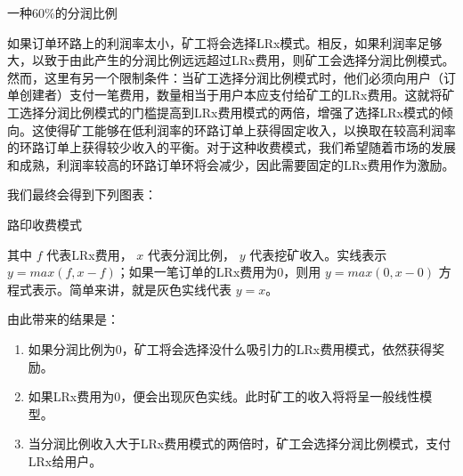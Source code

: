 \documentclass[UTF8]{ctexart}
\makeatletter
\newenvironment{figurehere}
 {\def\@captype{figure}}
 {}
\makeatother
\begin{document}
\begin{multicols}{2}
\begin{center}
\begin{figurehere}
\begin{tikzpicture}[
scale=1,
font=\normalfont,
classical/.style={thick,<->,shorten >=2pt,shorten <=2pt,>=stealth},
oneway/.style={->,dashed,shorten >=2pt,shorten <=2pt,>=stealth}
]
\end{tikzpicture}
\caption{一种60\%的分润比例}
\label{fig:marginsplit}
\end{figurehere}
\end{center}

如果订单环路上的利润率太小，矿工将会选择LRx模式。相反，如果利润率足够大，以致于由此产生的分润比例远远超过LRx费用，则矿工会选择分润比例模式。然而，这里有另一个限制条件：当矿工选择分润比例模式时，他们必须向用户（订单创建者）支付一笔费用，数量相当于用户本应支付给矿工的LRx费用。这就将矿工选择分润比例模式的门槛提高到LRx费用模式的两倍，增强了选择LRx模式的倾向。这使得矿工能够在低利润率的环路订单上获得固定收入，以换取在较高利润率的环路订单上获得较少收入的平衡。对于这种收费模式，我们希望随着市场的发展和成熟，利润率较高的环路订单环将会减少，因此需要固定的LRx费用作为激励。


我们最终会得到下列图表：


\begin{center}
\begin{figurehere}
\centering
{}
\caption{路印收费模式}
\label{fig:feemodel}
\end{figurehere}
\end{center}

其中 $f$ 代表LRx费用， $x$ 代表分润比例， $y$ 代表挖矿收入。实线表示 $y=max(f, x-f)$；如果一笔订单的LRx费用为0，则用 $y=max(0, x - 0)$ 方程式表示。简单来讲，就是灰色实线代表 $y=x$。


由此带来的结果是： 
\begin{enumerate}
	\item 如果分润比例为0，矿工将会选择没什么吸引力的LRx费用模式，依然获得奖励。
	\item 如果LRx费用为0，便会出现灰色实线。此时矿工的收入将将呈一般线性模型。
	\item 当分润比例收入大于LRx费用模式的两倍时，矿工会选择分润比例模式，支付LRx给用户。
\end{enumerate}


\end{multicols}
\end{document}
